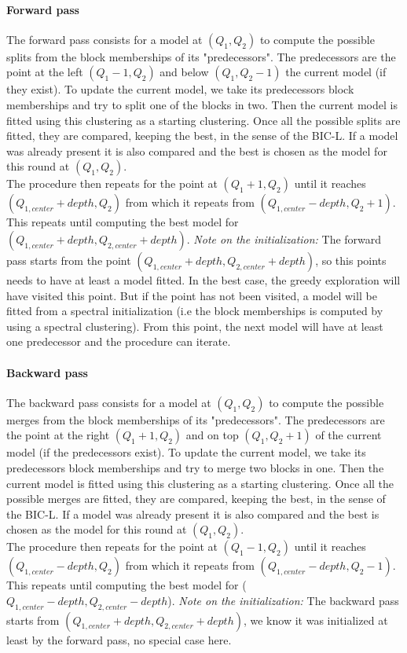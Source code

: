 \documentclass[12pt,a4paper]{report}
\begin{document}
\paragraph*{Forward pass} The forward pass consists for a model at $(Q_1, Q_2)$
to compute the possible splits from the block memberships of its "predecessors".
The predecessors are the point at the left $(Q_1 - 1, Q_2)$ and below
$(Q_1, Q_2 - 1)$ the current model (if they exist). To update the current model,
we take its predecessors block memberships and try to split one of the blocks in
two. Then the current model is fitted using this clustering as a starting
clustering. Once all the possible splits are fitted, they are compared, keeping
the best, in the sense of the BIC-L. If a model was already present it is also
compared and the best is chosen as the model for this round at $(Q_1, Q_2)$.\\
The procedure then repeats for the point at $(Q_1 + 1, Q_2)$ until it reaches
$(Q_{1,center} + depth, Q_2)$ from which it repeats from
$(Q_{1,center} - depth, Q_2 + 1)$. This repeats until computing the best model
for $(Q_{1,center} + depth, Q_{2,center} + depth)$.
\textit{Note on the initialization:} The forward pass starts from the point
$(Q_{1,center} + depth, Q_{2,center} + depth)$, so this points needs to have at
least a model fitted. In the best case, the greedy exploration will have visited
this point. But if the point has not been visited, a model will be fitted from
a spectral initialization (i.e the block memberships is computed by using a
spectral clustering). From this point, the next model will have at least one
predecessor and the procedure can iterate.

\paragraph*{Backward pass} The backward pass consists for a model at $(Q_1, Q_2)$
to compute the possible merges from the block memberships of its "predecessors".
The predecessors are the point at the right $(Q_1 + 1, Q_2)$ and on top
$(Q_1, Q_2 + 1)$ of the current model (if the predecessors exist). To update the
current model, we take its predecessors block memberships and try to merge two
blocks in one. Then the current model is fitted using this clustering as
a starting clustering. Once all the possible merges are fitted, they are
compared, keeping the best, in the sense of the BIC-L.
If a model was already present it is also
compared and the best is chosen as the model for this round at $(Q_1, Q_2)$.\\
The procedure then repeats for the point at $(Q_1 - 1, Q_2)$ until it reaches
$(Q_{1,center} - depth, Q_2)$ from which it repeats from
$(Q_{1,center} - depth, Q_2 - 1)$. This repeats until computing the best model
for ($Q_{1,center} - depth, Q_{2,center} - depth$).
\textit{Note on the initialization:} The backward pass starts from
$(Q_{1,center} + depth, Q_{2,center} + depth)$, we know it was initialized at
least by the forward pass, no special case here.\\
\end{document}

